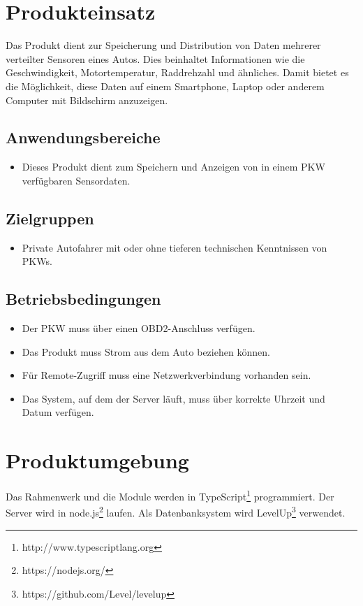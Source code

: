 \documentclass[pflichtenheft.tex]{subfiles}
\begin{document}
\chapter{Produkteinsatz}
Das Produkt dient zur Speicherung und Distribution von Daten mehrerer verteilter Sensoren eines Autos. Dies beinhaltet Informationen wie die Geschwindigkeit, Motortemperatur, Raddrehzahl und ähnliches. Damit bietet es die Möglichkeit, diese Daten  auf einem Smartphone, Laptop oder anderem Computer mit Bildschirm anzuzeigen.


\section{Anwendungsbereiche}
\begin{itemize}
\item
Dieses Produkt dient zum Speichern und Anzeigen von in einem PKW verfügbaren Sensordaten.
\end{itemize}


\section{Zielgruppen}
\begin{itemize}
\item
Private Autofahrer mit oder ohne tieferen technischen Kenntnissen von PKWs. 
\end{itemize}


\section{Betriebsbedingungen}
\begin{itemize}
\item
Der PKW muss über einen OBD2-Anschluss verfügen.
\item
Das Produkt muss Strom aus dem Auto beziehen können.
\item
Für Remote-Zugriff muss eine Netzwerkverbindung vorhanden sein.
\item
Das System, auf dem der Server läuft, muss über korrekte Uhrzeit und Datum verfügen.
\end{itemize}


\chapter{Produktumgebung}
Das Rahmenwerk und die Module werden in TypeScript\footnote{http://www.typescriptlang.org} programmiert. Der Server wird in node.js\footnote{https://nodejs.org/} laufen. Als Datenbanksystem wird LevelUp\footnote{https://github.com/Level/levelup} verwendet.
\end{document}
